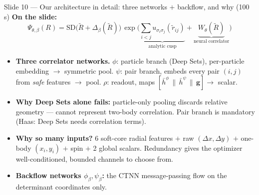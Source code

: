 \documentclass[11pt]{article}
\begin{document}
\begin{slide}{Slide 10 --- Our architecture in detail: three networks $+$ backflow, and why (100\,s)}
\textbf{On the slide:}
\[
\Psi_{\theta,\beta}(R)=\mathrm{SD}\big(\tilde R+\Delta_\beta(\tilde R)\big)\,
\exp\Big(\underbrace{\textstyle\sum_{i<j}u_{\sigma_i\sigma_j}(\tilde r_{ij})}_{\text{analytic cusp}}
+\underbrace{W_\theta(\tilde R)}_{\text{neural correlator}}\Big)
\]
\begin{itemize}[leftmargin=*]
\item \textbf{Three correlator networks.} $\phi$: particle branch (Deep Sets), per-particle embedding
$\to$ symmetric pool. $\psi$: pair branch, embeds every pair $(i,j)$ from \emph{safe} features $\to$
pool. $\rho$: readout, maps $[\bar h^\phi\,\|\,\bar h^\psi\,\|\,\mathbf g]\to$ scalar.
\item \textbf{Why Deep Sets alone fails:} particle-only pooling discards relative geometry --- cannot
represent two-body correlation. Pair branch is mandatory (Haas: Deep Sets needs correlation terms).
\item \textbf{Why so many inputs?} 6 soft-core radial features $+$ raw $(\Delta x,\Delta y)$ $+$
one-body $(x_i,y_i)$ $+$ spin $+$ 2 global scalars. Redundancy gives the optimizer well-conditioned,
bounded channels to choose from.
\item \textbf{Backflow networks $\phi_\beta,\psi_\beta$:} the CTNN message-passing flow on the
determinant coordinates only.
\end{itemize}
\end{slide}
\end{document}
